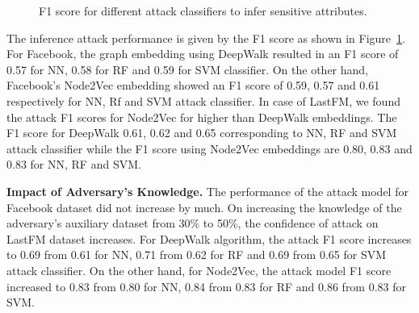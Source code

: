 \begin{figure}[!htb]
    \centering
    \begin{minipage}[b]{1\linewidth}
    \centering

    \end{minipage}
    \caption{F1 score for different attack classifiers to infer sensitive attributes.}
    \label{fig:aia}
\end{figure}

The inference attack performance is given by the F1 score as shown in Figure~\ref{fig:aia}.
For Facebook, the graph embedding using DeepWalk resulted in an F1 score of 0.57 for NN, 0.58 for RF and 0.59 for SVM classifier.
On the other hand, Facebook's Node2Vec embedding showed an F1 score of 0.59, 0.57 and 0.61 respectively for NN, Rf and SVM attack classifier.
In case of LastFM, we found the attack F1 scores for Node2Vec for higher than DeepWalk embeddings.
The F1 score for DeepWalk 0.61, 0.62 and 0.65 corresponding to NN, RF and SVM attack classifier while the F1 score using Node2Vec embeddings are 0.80, 0.83 and 0.83 for NN, RF and SVM.

\textbf{Impact of Adversary's Knowledge.} The performance of the attack model for Facebook dataset did not increase by much.
On increasing the knowledge of the adversary's auxiliary dataset from 30\% to 50\%, the confidence of attack on LastFM dataset increases.
For DeepWalk algorithm, the attack F1 score increases to 0.69 from 0.61 for NN, 0.71 from 0.62 for RF and 0.69 from 0.65 for SVM attack classifier.
On the other hand, for Node2Vec, the attack model F1 score increased to 0.83 from 0.80 for NN, 0.84 from 0.83 for RF and 0.86 from 0.83 for SVM.
